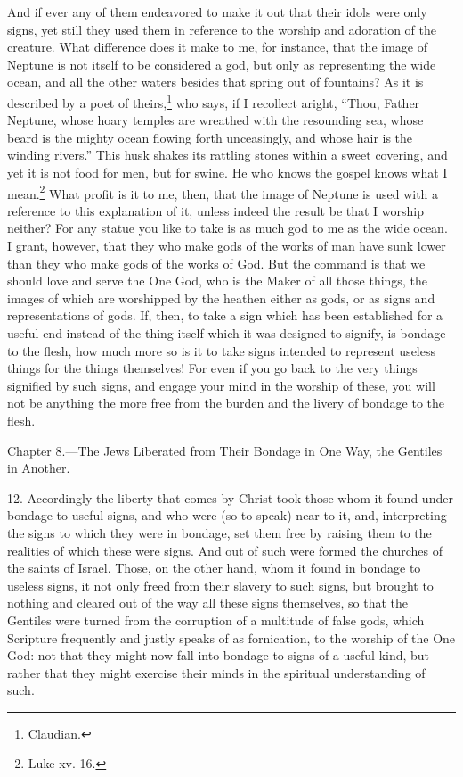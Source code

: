 And if ever any of them endeavored to make it out that their idols were only signs, yet still they used them in reference to the worship and adoration of the creature. What difference does it make to me, for instance, that the image of Neptune is not itself to be considered a god, but only as representing the wide ocean, and all the other waters besides that spring out of fountains? As it is described by a poet of theirs,\footnote{Claudian.} who says, if I recollect aright, “Thou, Father Neptune, whose hoary temples are wreathed with the resounding sea, whose beard is the mighty ocean flowing forth unceasingly, and whose  hair is the winding rivers.” This husk shakes its rattling stones within a sweet covering, and yet it is not food for men, but for swine. He who knows the gospel knows what I mean.\footnote{Luke xv. 16.} What profit is it to me, then, that the image of Neptune is used with a reference to this explanation of it, unless indeed the result be that I worship neither? For any statue you like to take is as much god to me as the wide ocean. I grant, however, that they who make gods of the works of man have sunk lower than they who make gods of the works of God. But the command is that we should love and serve the One God, who is the Maker of all those things, the images of which are worshipped by the heathen either as gods, or as signs and representations of gods. If, then, to take a sign which has been established for a useful end instead of the thing itself which it was designed to signify, is bondage to the flesh, how much more so is it to take signs intended to represent useless things for the things themselves! For even if you go back to the very things signified by such signs, and engage your mind in the worship of these, you will not be anything the more free from the burden and the livery of bondage to the flesh.


Chapter 8.—The Jews Liberated from Their Bondage in One Way, the Gentiles in Another.

12. Accordingly the liberty that comes by Christ took those whom it found under bondage to useful signs, and who were (so to speak) near to it, and, interpreting the signs to which they were in bondage, set them free by raising them to the realities of which these were signs. And out of such were formed the churches of the saints of Israel. Those, on the other hand, whom it found in bondage to useless signs, it not only freed from their slavery to such signs, but brought to nothing and cleared out of the way all these signs themselves, so that the Gentiles were turned from the corruption of a multitude of false gods, which Scripture frequently and justly speaks of as fornication, to the worship of the One God: not that they might now fall into bondage to signs of a useful kind, but rather that they might exercise their minds in the spiritual understanding of such.

